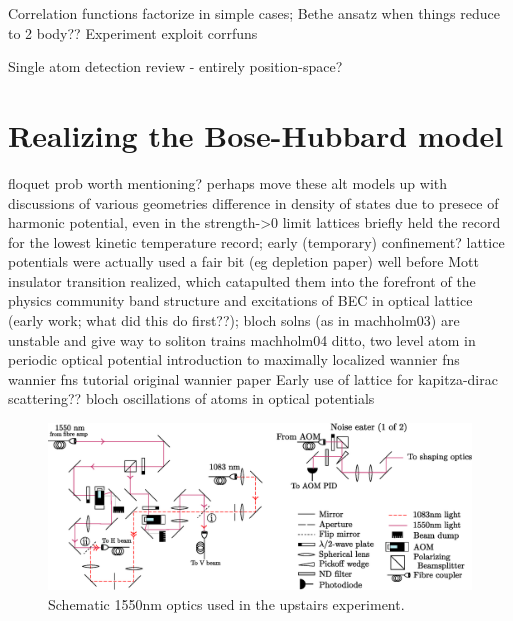 		Correlation functions factorize in simple cases; Bethe ansatz when things reduce to 2 body??
		Experiment exploit corrfuns 
			\cite{schweigler17}
			\cite{hodgman17}

			Single atom detection
	\cite{ott16} review - entirely position-space?


\section{Realizing the Bose-Hubbard model}
	\cite{grimm00}%
	\cite{miller93}%
	\cite{barrett01}%
	\cite{cabrera}%
	\cite{celi14}%
	\cite{gadway18}%
	\cite{ghose03}%
	floquet prob worth mentioning?
		perhaps move these alt models up with discussions of various geometries 
	\cite{hooley04}
		difference in density of states due to presece of harmonic potential, even in the strength->0 limit
	\cite{kastberg95}
		lattices briefly held the record for the lowest kinetic temperature record; early (temporary) confinement?
		lattice potentials were actually used a fair bit (eg depletion paper) well before Mott insulator transition realized, which catapulted them into the forefront of the physics community
	\cite{machholm03}
		band structure and excitations of BEC in optical lattice (early work; what did this do first??);
		bloch solns (as in machholm03) are unstable and give way to soliton trains machholm04
	ditto, two level atom in periodic optical potential
		\cite{wilkens91}
	introduction to maximally localized wannier fns
		\cite{marzari00}
	\cite{pavarini11}
		wannier fns tutorial
	original wannier paper
		\cite{wannier37}
	\cite{peik97}
		Early use of lattice for kapitza-dirac scattering?? bloch oscillations of atoms in optical potentials



	\begin{figure}[h]
	\centering
	\includegraphics[width=\textwidth]{fig/lattice/dipole_optics}
	\caption{Schematic 1550nm optics used in the upstairs experiment.}
	\label{fig:dipole_optics}
	\end{figure}

